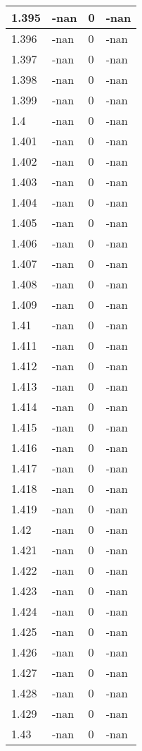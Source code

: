\documentclass[a4paper,14pt]{extarticle}
\begin{document}
\begin{longtable}{||m{3cm}||m{3cm}|m{3cm}||m{3cm}||}
\hline
1.395 & -nan & 0 & -nan\\
\hline
1.396 & -nan & 0 & -nan\\
\hline
1.397 & -nan & 0 & -nan\\
\hline
1.398 & -nan & 0 & -nan\\
\hline
1.399 & -nan & 0 & -nan\\
\hline
1.4 & -nan & 0 & -nan\\
\hline
1.401 & -nan & 0 & -nan\\
\hline
1.402 & -nan & 0 & -nan\\
\hline
1.403 & -nan & 0 & -nan\\
\hline
1.404 & -nan & 0 & -nan\\
\hline
1.405 & -nan & 0 & -nan\\
\hline
1.406 & -nan & 0 & -nan\\
\hline
1.407 & -nan & 0 & -nan\\
\hline
1.408 & -nan & 0 & -nan\\
\hline
1.409 & -nan & 0 & -nan\\
\hline
1.41 & -nan & 0 & -nan\\
\hline
1.411 & -nan & 0 & -nan\\
\hline
1.412 & -nan & 0 & -nan\\
\hline
1.413 & -nan & 0 & -nan\\
\hline
1.414 & -nan & 0 & -nan\\
\hline
1.415 & -nan & 0 & -nan\\
\hline
1.416 & -nan & 0 & -nan\\
\hline
1.417 & -nan & 0 & -nan\\
\hline
1.418 & -nan & 0 & -nan\\
\hline
1.419 & -nan & 0 & -nan\\
\hline
1.42 & -nan & 0 & -nan\\
\hline
1.421 & -nan & 0 & -nan\\
\hline
1.422 & -nan & 0 & -nan\\
\hline
1.423 & -nan & 0 & -nan\\
\hline
1.424 & -nan & 0 & -nan\\
\hline
1.425 & -nan & 0 & -nan\\
\hline
1.426 & -nan & 0 & -nan\\
\hline
1.427 & -nan & 0 & -nan\\
\hline
1.428 & -nan & 0 & -nan\\
\hline
1.429 & -nan & 0 & -nan\\
\hline
1.43 & -nan & 0 & -nan\\

\end{longtable}
\end{document}
